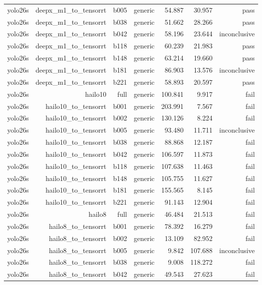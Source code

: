 \begin{table}[t]
\begin{tabular}{lrrrrrr}
yolo26s & deepx\_m1\_to\_tensorrt & b005 & generic & 54.887 & 30.957 & pass \\
yolo26s & deepx\_m1\_to\_tensorrt & b038 & generic & 51.662 & 28.266 & pass \\
yolo26s & deepx\_m1\_to\_tensorrt & b042 & generic & 58.196 & 23.644 & inconclusive \\
yolo26s & deepx\_m1\_to\_tensorrt & b118 & generic & 60.239 & 21.983 & pass \\
yolo26s & deepx\_m1\_to\_tensorrt & b148 & generic & 63.214 & 19.660 & pass \\
yolo26s & deepx\_m1\_to\_tensorrt & b181 & generic & 86.903 & 13.576 & inconclusive \\
yolo26s & deepx\_m1\_to\_tensorrt & b221 & generic & 58.893 & 20.597 & pass \\
yolo26s & hailo10 & full & generic & 100.841 & 9.917 & fail \\
yolo26s & hailo10\_to\_tensorrt & b001 & generic & 203.991 & 7.567 & fail \\
yolo26s & hailo10\_to\_tensorrt & b002 & generic & 130.126 & 8.224 & fail \\
yolo26s & hailo10\_to\_tensorrt & b005 & generic & 93.480 & 11.711 & inconclusive \\
yolo26s & hailo10\_to\_tensorrt & b038 & generic & 88.868 & 12.187 & fail \\
yolo26s & hailo10\_to\_tensorrt & b042 & generic & 106.597 & 11.873 & fail \\
yolo26s & hailo10\_to\_tensorrt & b118 & generic & 107.638 & 11.463 & fail \\
yolo26s & hailo10\_to\_tensorrt & b148 & generic & 105.755 & 11.627 & fail \\
yolo26s & hailo10\_to\_tensorrt & b181 & generic & 155.565 & 8.145 & fail \\
yolo26s & hailo10\_to\_tensorrt & b221 & generic & 91.143 & 12.904 & fail \\
yolo26s & hailo8 & full & generic & 46.484 & 21.513 & fail \\
yolo26s & hailo8\_to\_tensorrt & b001 & generic & 78.392 & 16.279 & fail \\
yolo26s & hailo8\_to\_tensorrt & b002 & generic & 13.109 & 82.952 & fail \\
yolo26s & hailo8\_to\_tensorrt & b005 & generic & 9.842 & 107.688 & inconclusive \\
yolo26s & hailo8\_to\_tensorrt & b038 & generic & 9.008 & 118.272 & fail \\
yolo26s & hailo8\_to\_tensorrt & b042 & generic & 49.543 & 27.623 & fail \\

\end{tabular}
\end{table}
